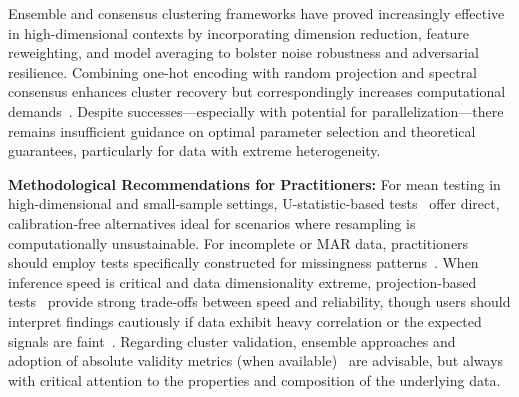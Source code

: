\documentclass[sigconf]{acmart}
\begin{document}
Ensemble and consensus clustering frameworks have proved increasingly effective in high-dimensional contexts by incorporating dimension reduction, feature reweighting, and model averaging to bolster noise robustness and adversarial resilience. Combining one-hot encoding with random projection and spectral consensus enhances cluster recovery but correspondingly increases computational demands~\cite{ref92,ref95}. Despite successes—especially with potential for parallelization—there remains insufficient guidance on optimal parameter selection and theoretical guarantees, particularly for data with extreme heterogeneity.

\textbf{Methodological Recommendations for Practitioners:} For mean testing in high-dimensional and small-sample settings, U-statistic-based tests~\cite{ref95} offer direct, calibration-free alternatives ideal for scenarios where resampling is computationally unsustainable. For incomplete or MAR data, practitioners should employ tests specifically constructed for missingness patterns~\cite{ref94}. When inference speed is critical and data dimensionality extreme, projection-based tests~\cite{ref91,ref92} provide strong trade-offs between speed and reliability, though users should interpret findings cautiously if data exhibit heavy correlation or the expected signals are faint~\cite{ref93}. Regarding cluster validation, ensemble approaches and adoption of absolute validity metrics (when available)~\cite{ref113} are advisable, but always with critical attention to the properties and composition of the underlying data.
\end{document}
